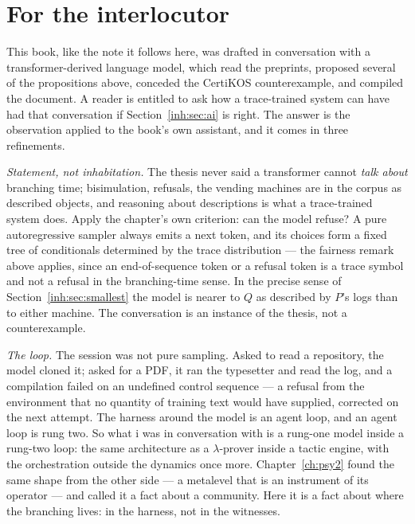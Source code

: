 \section{For the interlocutor}
\label{inh:sec:interlocutor}

This book, like the note it follows here, was drafted in conversation
with a transformer-derived language model, which read the preprints,
proposed several of the propositions above, conceded the CertiKOS
counterexample, and compiled the document.
A reader is entitled to ask how a trace-trained system can have had that
conversation if Section~\ref{inh:sec:ai} is right.
The answer is the observation applied to the book's own assistant, and
it comes in three refinements.

\emph{Statement, not inhabitation.}
The thesis never said a transformer cannot \emph{talk about} branching
time; bisimulation, refusals, the vending machines are in the corpus as
described objects, and reasoning about descriptions is what a
trace-trained system does.
Apply the chapter's own criterion: can the model refuse?
A pure autoregressive sampler always emits a next token, and its choices
form a fixed tree of conditionals determined by the trace distribution
--- the fairness remark above applies, since an end-of-sequence token
or a refusal token is a trace symbol and not a refusal in the
branching-time sense.
In the precise sense of Section~\ref{inh:sec:smallest} the model is
nearer to $Q$ as described by $P$'s logs than to either machine.
The conversation is an instance of the thesis, not a counterexample.

\emph{The loop.}
The session was not pure sampling.
Asked to read a repository, the model cloned it; asked for a PDF, it ran
the typesetter and read the log, and a compilation failed on an
undefined control sequence --- a refusal from the environment that no
quantity of training text would have supplied, corrected on the next
attempt.
The harness around the model is an agent loop, and an agent loop is
rung two.
So what i was in conversation with is a rung-one model inside a
rung-two loop: the same architecture as a $\lambda$-prover inside a
tactic engine, with the orchestration outside the dynamics once more.
Chapter~\ref{ch:psy2} found the same shape from the other side ---
a metalevel that is an instrument of its operator --- and called it a
fact about a community.
Here it is a fact about where the branching lives: in the harness,
not in the witnesses.

